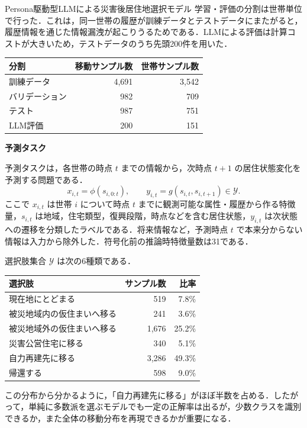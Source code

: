 \begin{column}{Persona駆動型LLMによる災害後居住地選択モデル}
学習・評価の分割は世帯単位で行った．これは，同一世帯の履歴が訓練データとテストデータにまたがると，履歴情報を通じた情報漏洩が起こりうるためである．LLMによる評価は計算コストが大きいため，テストデータのうち先頭200件を用いた．

\begin{center}
\scriptsize
\begin{tabular}{lrr}
\toprule
分割 & 移動サンプル数 & 世帯サンプル数 \\
\midrule
訓練データ & 4,691 & 3,542 \\
バリデーション & 982 & 709 \\
テスト & 987 & 751 \\
LLM評価 & 200 & 151 \\
\bottomrule
\end{tabular}
\end{center}

\medskip
\noindent
\textbf{予測タスク}

予測タスクは，各世帯の時点 \(t\) までの情報から，次時点 \(t+1\) の居住状態変化を予測する問題である．
\begin{equation}
x_{i,t}=\phi(s_{i,0:t}), \qquad
y_{i,t}=g(s_{i,t},s_{i,t+1}) \in \mathcal{Y}.
\end{equation}
ここで \(x_{i,t}\) は世帯 \(i\) について時点 \(t\) までに観測可能な属性・履歴から作る特徴量，\(s_{i,t}\) は地域，住宅類型，復興段階，時点などを含む居住状態，\(y_{i,t}\) は次状態への遷移を分類したラベルである．将来情報など，予測時点 \(t\) で本来分からない情報は入力から除外した．符号化前の推論時特徴量数は31である．

選択肢集合 \(\mathcal{Y}\) は次の6種類である．

\begin{center}
\scriptsize
\begin{tabular}{lrr}
\toprule
選択肢 & サンプル数 & 比率 \\
\midrule
現在地にとどまる & 519 & 7.8\% \\
被災地域内の仮住まいへ移る & 241 & 3.6\% \\
被災地域外の仮住まいへ移る & 1,676 & 25.2\% \\
災害公営住宅に移る & 340 & 5.1\% \\
自力再建先に移る & 3,286 & 49.3\% \\
帰還する & 598 & 9.0\% \\
\bottomrule
\end{tabular}
\end{center}

この分布から分かるように，「自力再建先に移る」がほぼ半数を占める．したがって，単純に多数派を選ぶモデルでも一定の正解率は出るが，少数クラスを識別できるか，また全体の移動分布を再現できるかが重要になる．


\end{column}
